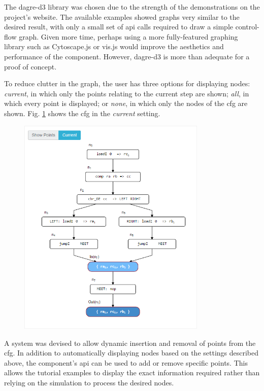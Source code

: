 \documentclass[bsc,twoside,singlespacing,parskip,logo,notimes,normalheadings]{infthesis}
\begin{document}
        The dagre-d3 library was chosen due to the strength of the
        demonstrations on the project's website\cite{dagre-demos}. The
        available examples showed graphs very similar to the desired
        result, with only a small set of \gls{api} calls required to
        draw a simple control-flow graph. Given more time, perhaps
        using a more fully-featured graphing library such as
        Cytoscape.js \cite{cytoscapejs} or vis.js \cite{vis.js} would
        improve the aesthetics and performance of the
        component. However, dagre-d3 is more than adequate for a proof
        of concept.

        To reduce clutter in the graph, the user has three options for
        displaying nodes: {\em current}, in which only the points
        relating to the current step are shown; {\em all}, in which
        every point is displayed; or {\em none}, in which only the
        nodes of the \gls{cfg} are shown. Fig. \ref{fig:cfg-vis} shows
        the \gls{cfg} in the {\em current} setting.

        \begin{figure}
            \includegraphics[width=9cm]{img/cfg-vis.png}
            \label{fig:cfg-vis}
        \end{figure}

        A system was devised to allow dynamic insertion and removal of
        points from the \gls{cfg}. In addition to automatically
        displaying nodes based on the settings described above, the
        component's \gls{api} can be used to add or remove specific
        points. This allows the tutorial examples to display the exact
        information required rather than relying on the simulation to
        process the desired nodes.
\end{document}
